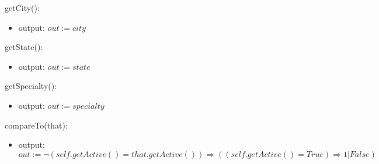 \documentclass[12pt]{article}
\begin{document}
\noindent getCity():
\begin{itemize}
\item output: $out := city$
\end{itemize}

\noindent getState():
\begin{itemize}
\item output: $out := state$
\end{itemize}

\noindent getSpecialty():
\begin{itemize}
\item output: $out := specialty$
\end{itemize} 

\noindent compareTo(that):
\begin{itemize}
\item output: $out := \neg (self.getActive() = that.getActive()) \Rightarrow ((self.getActive() = True) \Rightarrow 1 | False) $ 
\end{itemize} 
\end{document}
